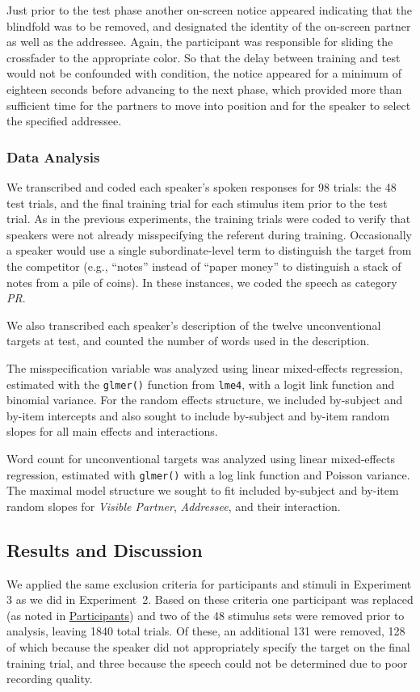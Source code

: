 \documentclass[natbib,doc,a4paper]{apa6}
\begin{document}
Just prior to the test phase another on-screen notice appeared indicating that the blindfold was to be removed, and designated the identity of the on-screen partner as well as the addressee. Again, the participant was responsible for sliding the crossfader to the appropriate color. So that the delay between training and test would not be confounded with condition, the notice appeared for a minimum of eighteen seconds before advancing to the next phase, which provided more than sufficient time for the partners to move into position and for the speaker to select the specified addressee.

\subsubsection*{Data Analysis}
\label{sec:orged97ed1}

We transcribed and coded each speaker's spoken responses for 98 trials: the 48 test trials, and the final training trial for each stimulus item prior to the test trial. As in the previous experiments, the training trials were coded to verify that speakers were not already misspecifying the referent during training. Occasionally a speaker would use a single subordinate-level term to distinguish the target from the competitor (e.g., ``notes'' instead of ``paper money'' to distinguish a stack of notes from a pile of coins). In these instances, we coded the speech as category \emph{PR}.

We also transcribed each speaker's description of the twelve unconventional targets at test, and counted the number of words used in the description.

The misspecification variable was analyzed using linear mixed-effects regression, estimated with the \texttt{glmer()} function from \texttt{lme4}, with a logit link function and binomial variance. For the random effects structure, we included by-subject and by-item intercepts and also sought to include by-subject and by-item random slopes for all main effects and interactions.

Word count for unconventional targets was analyzed using linear mixed-effects regression, estimated with \texttt{glmer()} with a log link function and Poisson variance. The maximal model structure we sought to fit included by-subject and by-item random slopes for \emph{Visible Partner}, \emph{Addressee}, and their interaction.

\subsection*{Results and Discussion}
\label{sec:org2d743d6}
We applied the same exclusion criteria for participants and stimuli in Experiment 3 as we did in Experiment~2. Based on these criteria one participant was replaced (as noted in \hyperref[sec:org5acce02]{Participants}) and two of the 48 stimulus sets were removed prior to analysis, leaving 1840 total trials.  Of these, an additional 131 were removed, 128 of which because the speaker did not appropriately specify the target on the final training trial, and three because the speech could not be determined due to poor recording quality.
\end{document}
